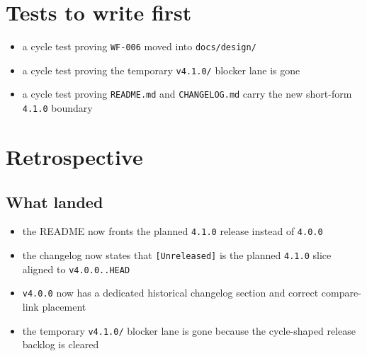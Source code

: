\section{Tests to write first}\label{record-204-tests-to-write-first}

\begin{itemize}
\tightlist
\item
  a cycle test proving \texttt{W\allowbreak{}F\allowbreak{}-\allowbreak{}0\allowbreak{}0\allowbreak{}6} moved into \texttt{d\allowbreak{}o\allowbreak{}c\allowbreak{}s\allowbreak{}/\allowbreak{}d\allowbreak{}e\allowbreak{}s\allowbreak{}i\allowbreak{}g\allowbreak{}n\allowbreak{}/}
\item
  a cycle test proving the temporary \texttt{v\allowbreak{}4\allowbreak{}.\allowbreak{}1\allowbreak{}.\allowbreak{}0\allowbreak{}/} blocker lane is gone
\item
  a cycle test proving \texttt{R\allowbreak{}E\allowbreak{}A\allowbreak{}D\allowbreak{}M\allowbreak{}E\allowbreak{}.\allowbreak{}m\allowbreak{}d} and \texttt{C\allowbreak{}H\allowbreak{}A\allowbreak{}N\allowbreak{}G\allowbreak{}E\allowbreak{}L\allowbreak{}O\allowbreak{}G\allowbreak{}.\allowbreak{}m\allowbreak{}d} carry the new short-form \texttt{4\allowbreak{}.\allowbreak{}1\allowbreak{}.\allowbreak{}0} boundary
\end{itemize}

\section{Retrospective}\label{record-204-retrospective}

\subsection{What landed}\label{record-204-what-landed}

\begin{itemize}
\tightlist
\item
  the README now fronts the planned \texttt{4\allowbreak{}.\allowbreak{}1\allowbreak{}.\allowbreak{}0} release instead of \texttt{4\allowbreak{}.\allowbreak{}0\allowbreak{}.\allowbreak{}0}
\item
  the changelog now states that \texttt{[\allowbreak{}U\allowbreak{}n\allowbreak{}r\allowbreak{}e\allowbreak{}l\allowbreak{}e\allowbreak{}a\allowbreak{}s\allowbreak{}e\allowbreak{}d\allowbreak{}]} is the planned \texttt{4\allowbreak{}.\allowbreak{}1\allowbreak{}.\allowbreak{}0} slice aligned to \texttt{v\allowbreak{}4\allowbreak{}.\allowbreak{}0\allowbreak{}.\allowbreak{}0\allowbreak{}.\allowbreak{}.\allowbreak{}H\allowbreak{}E\allowbreak{}A\allowbreak{}D}
\item
  \texttt{v\allowbreak{}4\allowbreak{}.\allowbreak{}0\allowbreak{}.\allowbreak{}0} now has a dedicated historical changelog section and correct compare-link placement
\item
  the temporary \texttt{v\allowbreak{}4\allowbreak{}.\allowbreak{}1\allowbreak{}.\allowbreak{}0\allowbreak{}/} blocker lane is gone because the cycle-shaped release backlog is cleared
\end{itemize}

